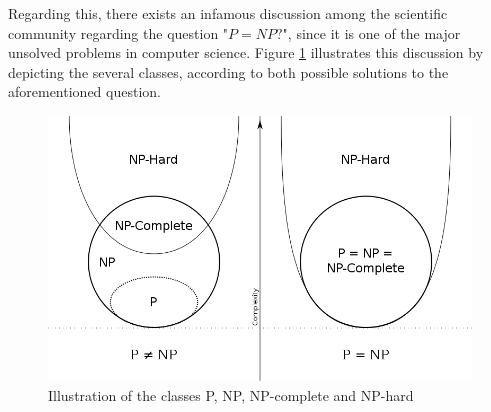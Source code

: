 Regarding this, there exists an infamous discussion among the scientific community regarding the question "$P=NP?$",
since it is one of the major unsolved problems in computer science.
Figure \ref{fig:p_vs_np} illustrates this discussion by depicting the several classes, according to both possible solutions to the aforementioned question.
\begin{figure}[htpb]
  \centering
  \includegraphics[width=.6\textwidth]{Figures/2.Chapter/p_vs_np.png}
	\caption{Illustration of the classes P, NP, NP-complete and NP-hard}
  \label{fig:p_vs_np}  
\end{figure}




